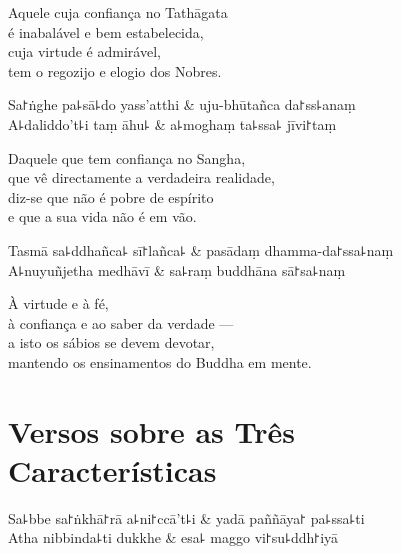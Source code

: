 \begin{english}
  Aquele cuja confiança no Tathāgata\\
  é inabalável e bem estabelecida,\\
  cuja virtude é admirável,\\
  tem o regozijo e elogio dos Nobres.
\end{english}

\begin{twochants}
  Sa꜓ṅghe pa꜕sā꜕do yass'atthi & uju-bhūtañca da꜓ss꜕anaṃ \\
  A꜕daliddo't꜕i taṃ āhu꜕ & a꜕moghaṃ ta꜕ssa꜕ jīvi꜓taṃ \\
\end{twochants}

\begin{english}
  Daquele que tem confiança no Sangha,\\
  que vê directamente a verdadeira realidade,\\
  diz-se que não é pobre de espírito\\
  e que a sua vida não é em vão.
\end{english}

\begin{twochants}
  Tasmā sa꜕ddhañca꜕ sī꜓lañca꜕ & pasādaṃ dhamma-da꜓ssa꜕naṃ \\
  A꜕nuyuñjetha medhāvī & sa꜕raṃ buddhāna sā꜓sa꜕naṃ \\
\end{twochants}

\begin{english}
  À virtude e à fé,\\
  à confiança e ao saber da verdade ---\\
  a isto os sábios se devem devotar,\\
  mantendo os ensinamentos do Buddha em mente.
\end{english}

\chapter{Versos sobre as Três Características}


\begin{leader}
\end{leader}

\begin{twochants}
  Sa꜕bbe sa꜓ṅkhā꜓rā a꜕ni꜓ccā't꜕i & yadā paññāya꜓ pa꜕ssa꜕ti \\
  Atha nibbinda꜕ti dukkhe & esa꜕ maggo vi꜓su꜕ddh꜓iyā \\
\end{twochants}

